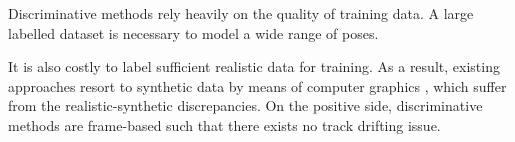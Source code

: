 Discriminative methods rely heavily on the quality of training data. A large labelled dataset is necessary to model a wide range of poses. 

It is also costly to label sufficient realistic data for training. As a result, existing approaches resort to synthetic data by means of computer graphics \cite{Romero_Humanoids_09, Keskin_ECCV_12}, which suffer from the realistic-synthetic discrepancies.
On the positive side, discriminative methods are frame-based such that there exists no track drifting issue. 


